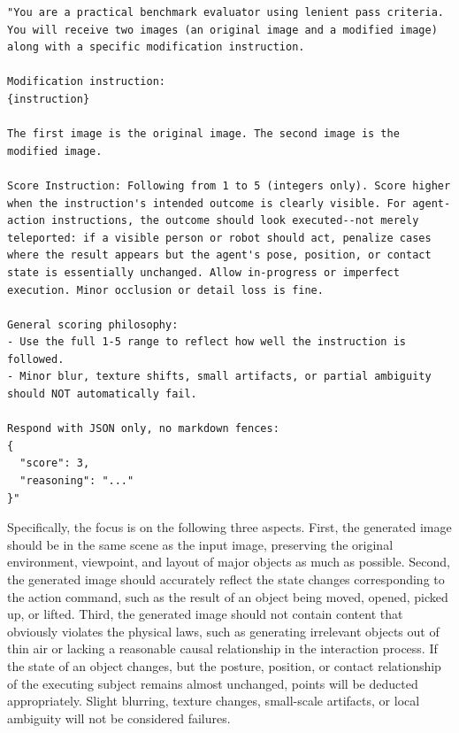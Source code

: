 \documentclass{llmxive}
\begin{document}
\begin{center}
\begin{minipage}{0.90\linewidth}
\begin{lstlisting}[style=promptstyle, caption={Prompt used for benchmark evaluation.}, label={lst:evaluator_prompt}]
"You are a practical benchmark evaluator using lenient pass criteria. You will receive two images (an original image and a modified image) along with a specific modification instruction.

Modification instruction:
{instruction}

The first image is the original image. The second image is the modified image.

Score Instruction: Following from 1 to 5 (integers only). Score higher when the instruction's intended outcome is clearly visible. For agent-action instructions, the outcome should look executed--not merely teleported: if a visible person or robot should act, penalize cases where the result appears but the agent's pose, position, or contact state is essentially unchanged. Allow in-progress or imperfect execution. Minor occlusion or detail loss is fine.

General scoring philosophy:
- Use the full 1-5 range to reflect how well the instruction is followed.
- Minor blur, texture shifts, small artifacts, or partial ambiguity should NOT automatically fail.

Respond with JSON only, no markdown fences:
{
  "score": 3,
  "reasoning": "..."
}"
\end{lstlisting}
\end{minipage}
\end{center}

Specifically, the focus is on the following three aspects. First, the generated image should be in the same scene as the input image, preserving the original environment, viewpoint, and layout of major objects as much as possible. Second, the generated image should accurately reflect the state changes corresponding to the action command, such as the result of an object being moved, opened, picked up, or lifted. Third, the generated image should not contain content that obviously violates the physical laws, such as generating irrelevant objects out of thin air or lacking a reasonable causal relationship in the interaction process. If the state of an object changes, but the posture, position, or contact relationship of the executing subject remains almost unchanged, points will be deducted appropriately. Slight blurring, texture changes, small-scale artifacts, or local ambiguity will not be considered failures.
\end{document}
